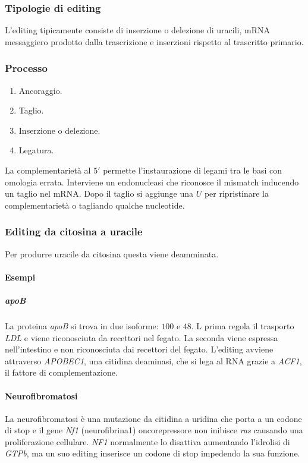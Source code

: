 		\subsubsection{Tipologie di editing}
		L'editing tipicamente consiste di inserzione o delezione di uracili, mRNA messaggiero prodotto dalla trascrizione e inserzioni rispetto al trascritto primario.

		\subsubsection{Processo}
		\begin{multicols}{2}
			\begin{enumerate}
				\item Ancoraggio.
				\item Taglio.
				\item Inserzione o delezione.
				\item Legatura.
			\end{enumerate}
		\end{multicols}
		La complementariet\`a al $5'$ permette l'instaurazione di legami tra le basi con omologia errata.
		Interviene un endonucleasi che riconosce il mismatch inducendo un taglio nel mRNA.
		Dopo il taglio si aggiunge una $U$ per ripristinare la complementariet\`a o tagliando qualche nucleotide.

		\subsubsection{Editing da citosina a uracile}
		Per produrre uracile da citosina questa viene deamminata.

			\paragraph{Esempi}

				\subparagraph{\emph{apoB}}
				La proteina \emph{apoB} si trova in due isoforme: $100$ e $48$.
				L prima regola il trasporto \emph{LDL} e viene riconosciuta da recettori nel fegato.
				La seconda viene espressa nell'intestino e non riconosciuta dai recettori del fegato.
				L'editing avviene attraverso \emph{APOBEC1}, una citidina deaminasi, che si lega al RNA grazie a \emph{ACF1}, il fattore di complementazione.

				\paragraph{Neurofibromatosi}
				La neurofibromatosi \`e una mutazione da citidina a uridina che porta a un codone di stop e il gene \emph{Nf1} (neurofibrina1) oncorepressore non inibisce \emph{ras} causando una proliferazione cellulare.
				\emph{NF1} normalmente lo disattiva aumentando l'idrolisi di \emph{GTPb}, ma un suo editing inserisce un codone di stop impedendo la sua funzione.


